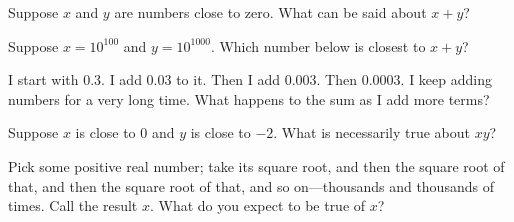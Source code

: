 \documentclass{ximera}
\begin{document}
\begin{problem}
  Suppose $x$ and $y$ are numbers close to zero.  What can be said about $x+y$?
  \begin{multipleChoice}
  \end{multipleChoice}
\end{problem}

\begin{problem}
  Suppose $x = 10^{100}$ and $y = 10^{1000}$.  Which number below is closest to $x + y$?
  \begin{multipleChoice}
  \end{multipleChoice}
\end{problem}

\begin{problem}
  I start with $0.3$.  I add $0.03$ to it.  Then I add $0.003$.  Then $0.0003$.  I keep adding numbers for a very long time.  What happens to the sum as I add more terms?
  \begin{multipleChoice}
  \end{multipleChoice}
\end{problem}



\begin{problem}
  Suppose $x$ is close to $0$ and $y$ is close to $-2$.  What is necessarily true about $xy$?
  \begin{multipleChoice}
  \end{multipleChoice}
\end{problem}

\begin{problem}
  Pick some positive real number; take its square root, and then the
  square root of that, and then the square root of that, and so
  on---thousands and thousands of times.  Call the result $x$.  What
  do you expect to be true of $x$?
  \begin{multipleChoice}
  \end{multipleChoice}
\end{problem}
\end{document}
